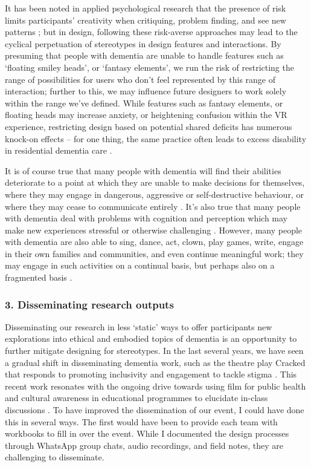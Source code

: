 It has been noted in applied psychological research that the presence of risk limits participants’ creativity when critiquing, problem finding, and see new patterns \citep{amabile_social_1990}; but in design, following these risk-averse approaches may lead to the cyclical perpetuation of stereotypes in design features and interactions. By presuming that people with dementia are unable to handle features such as ‘floating smiley heads’, or ‘fantasy elements’, we run the risk of restricting the range of possibilities for users who don’t feel represented by this range of interaction; further to this, we may influence future designers to work solely within the range we’ve defined. While features such as fantasy elements, or floating heads may increase anxiety, or heightening confusion within the VR experience, restricting design based on potential shared deficits has numerous knock-on effects – for one thing, the same practice often leads to excess disability in residential dementia care \citep{keady_involving_2007}. 

It is of course true that many people with dementia will find their abilities deteriorate to a point at which they are unable to make decisions for themselves, where they may engage in dangerous, aggressive or self-destructive behaviour, or where they may cease to communicate entirely \citep{baumgart_summary_2015}. It’s also true that many people with dementia deal with problems with cognition and perception which may make new experiences stressful or otherwise challenging \citep{west_operationalising_2017}. However, many people with dementia are also able to sing, dance, act, clown, play games, write, engage in their own families and communities, and even continue meaningful work; they may engage in such activities on a continual basis, but perhaps also on a fragmented basis \citep{landmark_couples_2021}. 

\subsubsection{3. Disseminating research outputs}
\label{sterotype:Three}
Disseminating our research in less ‘static’ ways to offer participants new explorations into ethical and embodied topics of dementia is an opportunity to further mitigate designing for stereotypes. In the last several years, we have seen a gradual shift in disseminating dementia work, such as the theatre play Cracked that responds to promoting inclusivity and engagement to tackle stigma \citep{kontos_raising_2018}. This recent work resonates with the ongoing drive towards using film for public health and cultural awareness in educational programmes to elucidate in-class discussions \citep{botchway2017films}. To have improved the dissemination of our event, I could have done this in several ways. The first would have been to provide each team with workbooks \citep{mucha2020co} to fill in over the event. While I documented the design processes through WhatsApp group chats, audio recordings, and field notes, they are challenging to disseminate. 

